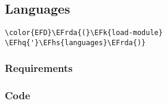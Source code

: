 \documentclass[a4wide,10pt]{article}
\newcommand{\EFk}[1]{\textcolor{EFk}{#1}} %
\newcommand{\EFhq}[1]{\textcolor{EFhq}{#1}} %
\newcommand{\EFhs}[1]{\textcolor{EFhs}{#1}} %
\newcommand{\EFrda}[1]{\textcolor{EFrda}{#1}} %
\begin{document}
\subsection{Languages}
\label{sec:orgde335fe}
\begin{Code}
\begin{Verbatim}
\color{EFD}\EFrda{(}\EFk{load-module} \EFhq{'}\EFhs{languages}\EFrda{)}
\end{Verbatim}
\end{Code}
\subsubsection{Requirements}
\label{sec:org0920a22}
\subsubsection{Code}
\label{sec:org82f8ce6}
\end{document}
